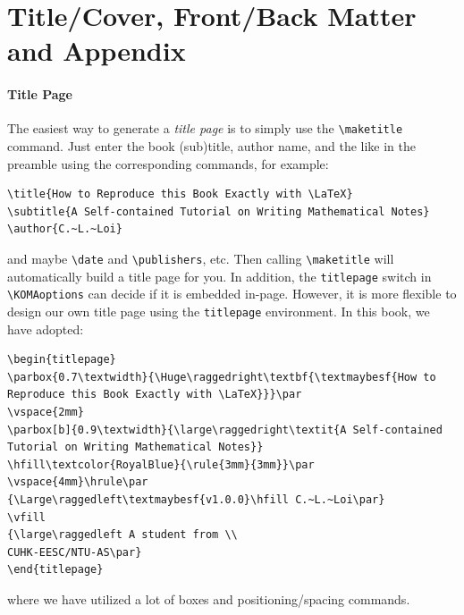 \section{Title/Cover, Front/Back Matter and Appendix}

\paragraph{Title Page}
The easiest way to generate a \textit{title page} is to simply use the \texttt{\textbackslash make\allowbreak title} command. Just enter the book (sub)title, author name, and the like in the preamble using the corresponding commands, for example:
\begin{lstlisting}
\title{How to Reproduce this Book Exactly with \LaTeX}
\subtitle{A Self-contained Tutorial on Writing Mathematical Notes}
\author{C.~L.~Loi}
\end{lstlisting}
and maybe \texttt{\textbackslash date} and \texttt{\textbackslash publishers}, etc. Then calling \texttt{\textbackslash maketitle} will automatically build a title page for you. In addition, the \texttt{titlepage} switch in \texttt{\textbackslash KOMAoptions} can decide if it is embedded in-page. However, it is more flexible to design our own title page using the \texttt{titlepage} environment. In this book, we have adopted:
\begin{lstlisting}
\begin{titlepage}
\parbox{0.7\textwidth}{\Huge\raggedright\textbf{\textmaybesf{How to Reproduce this Book Exactly with \LaTeX}}}\par
\vspace{2mm}
\parbox[b]{0.9\textwidth}{\large\raggedright\textit{A Self-contained Tutorial on Writing Mathematical Notes}}
\hfill\textcolor{RoyalBlue}{\rule{3mm}{3mm}}\par
\vspace{4mm}\hrule\par
{\Large\raggedleft\textmaybesf{v1.0.0}\hfill C.~L.~Loi\par}
\vfill
{\large\raggedleft A student from \\ 
CUHK-EESC/NTU-AS\par}
\end{titlepage}
\end{lstlisting}
where we have utilized a lot of boxes and positioning/spacing commands.

